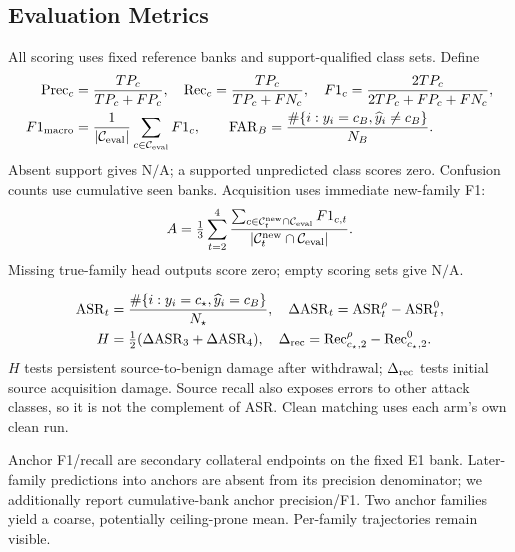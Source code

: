 \documentclass[10pt,a4paper]{article}
\newcommand{\NA}{\mathrm{N/A}}
\begin{document}
\subsection{Evaluation Metrics}
All scoring uses fixed reference banks and support-qualified class sets. Define
\begin{equation}
\begin{aligned}
\mathrm{Prec}_c&=\frac{TP_c}{TP_c+FP_c},\quad\mathrm{Rec}_c=\frac{TP_c}{TP_c+FN_c},\quad
F1_c=\frac{2TP_c}{2TP_c+FP_c+FN_c},\\
F1_{\rm macro}&=\frac1{|\mathcal C_{\rm eval}|}\sum_{c\in\mathcal C_{\rm eval}}F1_c,\qquad
\mathrm{FAR}_B=\frac{\#\{i:y_i=c_B,\widehat y_i\ne c_B\}}{N_B}.
\end{aligned}
\label{eq:metrics}
\end{equation}
Absent support gives $\NA$; a supported unpredicted class scores zero. Confusion counts use cumulative seen banks. Acquisition uses immediate new-family F1:
\begin{equation}
A=\tfrac13\sum_{t=2}^4\frac{\sum_{c\in\mathcal C_t^{\rm new}\cap\mathcal C_{\rm eval}}F1_{c,t}}{|\mathcal C_t^{\rm new}\cap\mathcal C_{\rm eval}|}.
\label{eq:acquisition}
\end{equation}
Missing true-family head outputs score zero; empty scoring sets give $\NA$.

\begin{equation}
\begin{aligned}
\mathrm{ASR}_t&=\frac{\#\{i:y_i=c_\star,\widehat y_i=c_B\}}{N_\star},\quad
\Delta\mathrm{ASR}_t=\mathrm{ASR}^{\rho}_t-\mathrm{ASR}^{0}_t,\\
H&=\tfrac12(\Delta\mathrm{ASR}_3+\Delta\mathrm{ASR}_4),\quad
\Delta_{\rm rec}=\mathrm{Rec}^{\rho}_{c_\star,2}-\mathrm{Rec}^{0}_{c_\star,2}.
\end{aligned}
\label{eq:asr}
\end{equation}
$H$ tests persistent source-to-benign damage after withdrawal; $\Delta_{\rm rec}$ tests initial source acquisition damage. Source recall also exposes errors to other attack classes, so it is not the complement of ASR. Clean matching uses each arm's own clean run.

Anchor F1/recall are secondary collateral endpoints on the fixed E1 bank. Later-family predictions into anchors are absent from its precision denominator; we additionally report cumulative-bank anchor precision/F1. Two anchor families yield a coarse, potentially ceiling-prone mean. Per-family trajectories remain visible.
\end{document}

